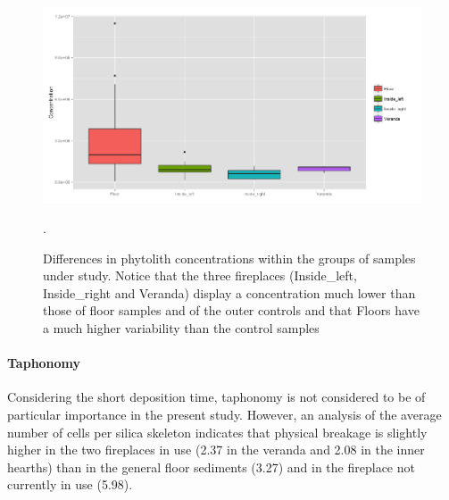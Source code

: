 \documentclass[authoryear,preprint,review,12pt]{elsarticle}
\begin{document}
\begin{figure}[ht!]
  \begin{center}
    \includegraphics[width=15cm]{figures/concentration_groups}
    \caption{Differences in phytolith concentrations within the groups of samples under study. Notice that the three fireplaces (Inside\_left, Inside\_right and Veranda) display a concentration much lower than those of floor samples and of the outer controls and that Floors have a much higher variability than the control samples}.
    \label{fig:conc}
  \end{center}
\end{figure}

\paragraph{Taphonomy}
Considering the short deposition time, taphonomy is not considered to be of particular importance in the present study. However, an analysis of the average number of cells per silica skeleton indicates that physical breakage is slightly higher in the two fireplaces in use (2.37 in the veranda and 2.08 in the inner hearths) than in the general floor sediments (3.27) and in the fireplace not currently in use (5.98).
\end{document}
